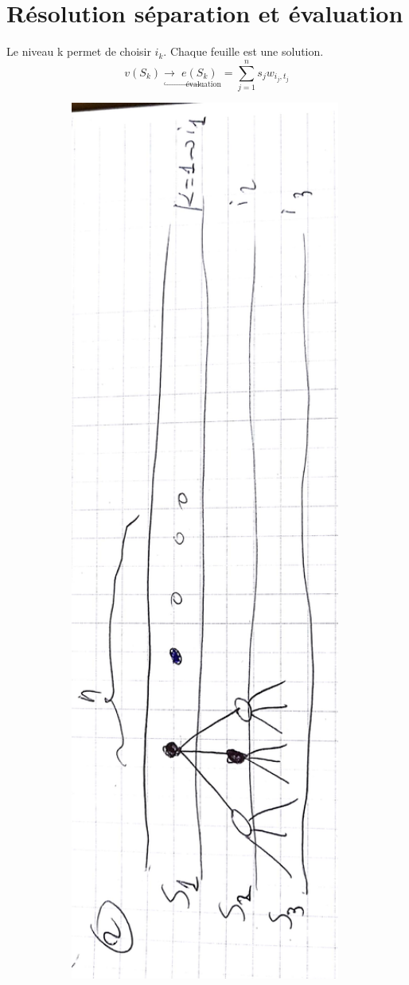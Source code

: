 \documentclass[11pt,a4paper]{article}
\begin{document}
	\section{Résolution séparation et évaluation}
	
	Le niveau k permet de choisir $i_k$. Chaque feuille est une solution.
	$$v(S_k) \rightarrow \underset{\hookrightarrow\text{évaluation}}{e(S_k)} = \sum_{j=1}^{n} s_j w_{i_{j},t_{j}}$$
	
	
	\includegraphics[angle=-90,width=0.99\textwidth]{schema.jpg}
	
\end{document}
